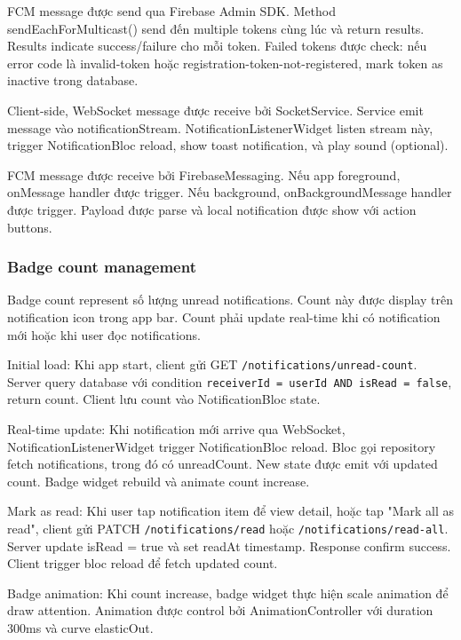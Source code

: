 FCM message được send qua Firebase Admin SDK. Method sendEachForMulticast() send đến multiple tokens cùng lúc và return results. 
Results indicate success/failure cho mỗi token. Failed tokens được check: nếu error code là invalid-token hoặc registration-token-not-registered, mark token as inactive trong database.

Client-side, WebSocket message được receive bởi SocketService. Service emit message vào notificationStream. 
NotificationListenerWidget listen stream này, trigger NotificationBloc reload, show toast notification, và play sound (optional).

FCM message được receive bởi FirebaseMessaging. Nếu app foreground, onMessage handler được trigger. Nếu background, onBackgroundMessage handler được trigger. 
Payload được parse và local notification được show với action buttons.

\subsubsection{Badge count management}
Badge count represent số lượng unread notifications. Count này được display trên notification icon trong app bar. 
Count phải update real-time khi có notification mới hoặc khi user đọc notifications.

Initial load: Khi app start, client gửi GET \texttt{/notifications/unread-count}. Server query database với condition \texttt{receiverId = userId AND isRead = false}, return count. 
Client lưu count vào NotificationBloc state.

Real-time update: Khi notification mới arrive qua WebSocket, NotificationListenerWidget trigger NotificationBloc reload. 
Bloc gọi repository fetch notifications, trong đó có unreadCount. New state được emit với updated count. Badge widget rebuild và animate count increase.

Mark as read: Khi user tap notification item để view detail, hoặc tap "Mark all as read", client gửi PATCH \texttt{/notifications/read} hoặc \texttt{/notifications/read-all}. 
Server update isRead = true và set readAt timestamp. Response confirm success. Client trigger bloc reload để fetch updated count.

Badge animation: Khi count increase, badge widget thực hiện scale animation để draw attention. Animation được control bởi AnimationController với duration 300ms và curve elasticOut.


